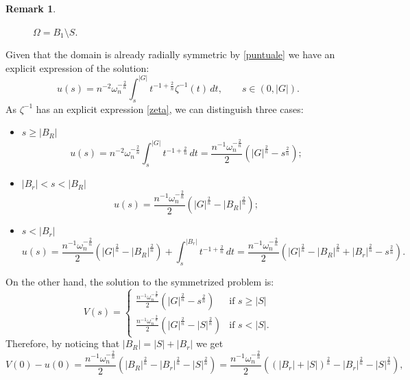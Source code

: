 \documentclass[oneside,a4paper,11pt,notitlepage]{article}
\newcommand{\abs}[1]{{\left|#1\right|}}
\theoremstyle{definition}
\theoremstyle{plain}
\theoremstyle{definition}
\newtheorem{oss}[esempio]{Remark}
\begin{document}
\begin{oss}
\begin{figure}[!ht]
     \caption{$\Omega=B_1\setminus S.$}
 \end{figure}   
    \newline Given that the domain is already radially symmetric by \eqref{puntuale} we have an explicit expression of the solution:
\[u(s)=n^{-2}\omega_n^{-\frac{2}{n}}\int_s^{\abs{G}}t^{-1+\frac{2}{n}}\zeta^{-1}(t)\,dt,\qquad s\in(0,\abs{G}).\] As $\zeta^{-1}$ has an explicit expression \eqref{zeta}, we can distinguish three cases:
\begin{itemize}
    \item $s\geq \abs{B_R}$ \[u(s)=n^{-2}\omega_n^{-\frac{2}{n}}\int_s^{\abs{G}}t^{-1+\frac{2}{n}}\,dt=\frac{n^{-1}\omega_n^{-\frac{2}{n}}}{2}\left(\abs{G}^\frac{2}{n}-s^\frac{2}{n}\right);\]
    \item $\abs{B_r}<s<\abs{B_R}$ \[u(s)=\frac{n^{-1}\omega_n^{-\frac{2}{n}}}{2}\left(\abs{G}^\frac{2}{n}-\abs{B_R}^\frac{2}{n}\right);\]
    \item $s< \abs{B_r}$ \[u(s)=\frac{n^{-1}\omega_n^{-\frac{2}{n}}}{2}\left(\abs{G}^\frac{2}{n}-\abs{B_R}^\frac{2}{n}\right)+\int_s^\abs{B_r}t^{-1+\frac{2}{n}}\,dt=\frac{n^{-1}\omega_n^{-\frac{2}{n}}}{2}\left(\abs{G}^\frac{2}{n}-\abs{B_R}^\frac{2}{n}+\abs{B_r}^\frac{2}{n}-s^\frac{2}{n}\right).\]
\end{itemize}
On the other hand, the solution to the symmetrized problem is:
\begin{equation*}
    V(s)=\begin{cases}
        \displaystyle{\frac{n^{-1}\omega_n^{-\frac{2}{n}}}{2}(\abs{G}^\frac{2}{n}-s^\frac{2}{n})} & \text{if } s\geq\abs{S}\\
        \displaystyle{\frac{n^{-1}\omega_n^{-\frac{2}{n}}}{2}(\abs{G}^\frac{2}{n}-\abs{S}^\frac{2}{n})} & \text{if } s<\abs{S}.
    \end{cases}
\end{equation*}
Therefore, by noticing that $\abs{B_R}=\abs{S}+\abs{B_r}$ we get
\begin{equation*}
    V(0)-u(0)=\frac{n^{-1}\omega_n^{-\frac{2}{n}}}{2}\left(\abs{B_R}^\frac{2}{n}-\abs{B_r}^\frac{2}{n}-\abs{S}^\frac{2}{n}\right)=\frac{n^{-1}\omega_n^{-\frac{2}{n}}}{2}\left(\left(\abs{B_r}+\abs{S}\right)^\frac{2}{n}-\abs{B_r}^\frac{2}{n}-\abs{S}^\frac{2}{n}\right),

\end{equation*}
\end{oss}
\end{document}

